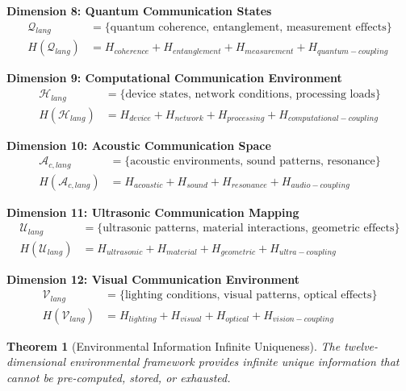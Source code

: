 \documentclass[12pt,a4paper]{article}
\newtheorem{theorem}{Theorem}
\begin{document}
\textbf{Dimension 8: Quantum Communication States}
\begin{align}
\mathcal{Q}_{lang} &= \{\text{quantum coherence, entanglement, measurement effects}\} \\
H(\mathcal{Q}_{lang}) &= H_{coherence} + H_{entanglement} + H_{measurement} + H_{quantum-coupling}
\end{align}

\textbf{Dimension 9: Computational Communication Environment}
\begin{align}
\mathcal{H}_{lang} &= \{\text{device states, network conditions, processing loads}\} \\
H(\mathcal{H}_{lang}) &= H_{device} + H_{network} + H_{processing} + H_{computational-coupling}
\end{align}

\textbf{Dimension 10: Acoustic Communication Space}
\begin{align}
\mathcal{A}_{c,lang} &= \{\text{acoustic environments, sound patterns, resonance}\} \\
H(\mathcal{A}_{c,lang}) &= H_{acoustic} + H_{sound} + H_{resonance} + H_{audio-coupling}
\end{align}

\textbf{Dimension 11: Ultrasonic Communication Mapping}
\begin{align}
\mathcal{U}_{lang} &= \{\text{ultrasonic patterns, material interactions, geometric effects}\} \\
H(\mathcal{U}_{lang}) &= H_{ultrasonic} + H_{material} + H_{geometric} + H_{ultra-coupling}
\end{align}

\textbf{Dimension 12: Visual Communication Environment}
\begin{align}
\mathcal{V}_{lang} &= \{\text{lighting conditions, visual patterns, optical effects}\} \\
H(\mathcal{V}_{lang}) &= H_{lighting} + H_{visual} + H_{optical} + H_{vision-coupling}
\end{align}

\begin{theorem}[Environmental Information Infinite Uniqueness]
The twelve-dimensional environmental framework provides infinite unique information that cannot be pre-computed, stored, or exhausted.
\end{theorem}
\end{document}
